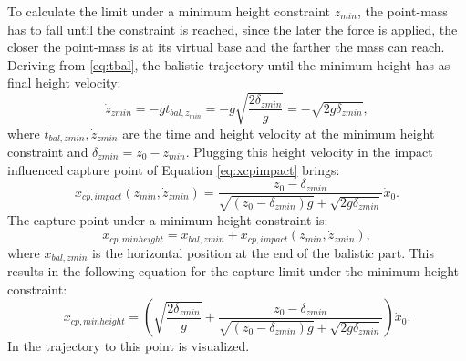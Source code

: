 To calculate the limit under a minimum height constraint $z_{min}$, the point-mass has to fall until the constraint is reached, since the later the force is applied, the closer the point-mass is at its virtual base and the farther the mass can reach. Deriving from \ref{eq:tbal}, the balistic trajectory until the minimum height has as final height velocity:
\begin{equation}
	\dot{z}_{zmin} = -gt_{bal,z_{min}} = -g\sqrt{\frac{2\delta_{zmin}}{g}} = -\sqrt{2g\delta_{zmin}},
\end{equation}
where $t_{bal,zmin}, \dot{z}_{zmin}$ are the time and height velocity at the minimum height constraint and $\delta_{zmin}=z_0-z_{min}$. Plugging this height velocity in the impact influenced capture point of Equation \eqref{eq:xcpimpact} brings:
\begin{equation}
	x_{cp,impact}(z_{min}, \dot{z}_{zmin})= \frac{z_0-\delta_{zmin}}{\sqrt{(z_0-\delta_{zmin})g}+\sqrt{2g\delta_{zmin}}}\dot{x}_0.
\end{equation}
The capture point under a minimum height constraint is:
\begin{equation}
	x_{cp,minheight} =x_{bal,zmin}+x_{cp,impact}(z_{min}, \dot{z}_{zmin}) ,
\end{equation}
where  $x_{bal,zmin}$ is the horizontal position at the end of the balistic part. This results in the following equation for the capture limit under the minimum height constraint:
\begin{equation}
 x_{cp,minheight}=(\sqrt{\frac{2\delta_{zmin}}{g}} +\frac{z_0-\delta_{zmin}}{\sqrt{(z_0-\delta_{zmin})g}+\sqrt{2g\delta_{zmin}}})\dot{x}_0.
\end{equation}
In  the trajectory to this point is visualized.
